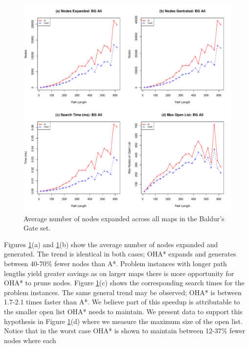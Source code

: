 \begin{figure}[htbp]
	\vspace{-2pt}
	\begin{center}
		       \includegraphics[scale=0.35, trim = 20mm 17mm 20mm 5mm]{diagrams/bg_effort.pdf}
	\end{center}
	\caption{Average number of nodes expanded across all maps in the Baldur's Gate set.}
	\label{fig-searcheffort}
	\vspace{-12pt}
\end{figure}
\par \indent
Figures \ref{fig-searcheffort}(a) and \ref{fig-searcheffort}(b)  show the average number of 
nodes expanded and generated. 
The trend is identical in both cases; OHA* expands and generates between 40-70\% fewer nodes than A*.
Problem instances with longer path lengths yield greater savings as on larger maps there is more 
opportunity for OHA* to prune nodes. 
Figure \ref{fig-searcheffort}(c) shows the corresponding search times for the problem instances. 
The same general trend may be observed; OHA* is between 1.7-2.1 times faster than A*.
We believe part of this speedup is attributable to the smaller open list OHA* needs to maintain.
We present data to support this hypothesis in Figure \ref{fig-searcheffort}(d) where we measure 
the maximum size of the open list. 
Notice that in the worst case OHA* is shown to maintain between 12-37\% fewer nodes where each
